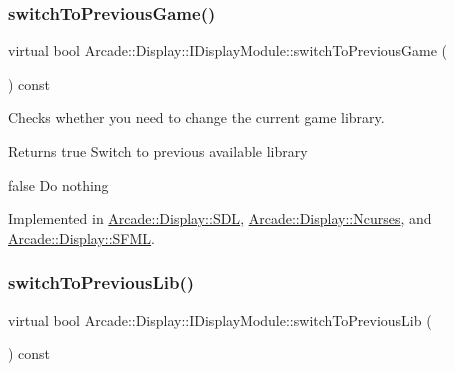 \mbox{\label{classArcade_1_1Display_1_1IDisplayModule_a3bbbfe00907c8f3e4c7ef1aadedcc513}} 
\subsubsection{\texorpdfstring{switchToPreviousGame()}{switchToPreviousGame()}}
{\footnotesize\ttfamily virtual bool Arcade\+::\+Display\+::\+I\+Display\+Module\+::switch\+To\+Previous\+Game (\begin{DoxyParamCaption}{ }\end{DoxyParamCaption}) const\hspace{0.3cm}{\ttfamily [pure virtual]}}



Checks whether you need to change the current game library. 

\begin{DoxyReturn}{Returns}
true Switch to previous available library 

false Do nothing 
\end{DoxyReturn}


Implemented in \mbox{\hyperlink{classArcade_1_1Display_1_1SDL_ad9bf495fb4e7499c81b2d65a0602e7f1}{Arcade\+::\+Display\+::\+S\+DL}}, \mbox{\hyperlink{classArcade_1_1Display_1_1Ncurses_ad2e7818db1e8f3328083ed6cab2f7517}{Arcade\+::\+Display\+::\+Ncurses}}, and \mbox{\hyperlink{classArcade_1_1Display_1_1SFML_ae5dbff9dd547fb0a09e478e11bf74c11}{Arcade\+::\+Display\+::\+S\+F\+ML}}.

\mbox{\label{classArcade_1_1Display_1_1IDisplayModule_a498d51597164e9f92e97ec2afee426b0}} 
\subsubsection{\texorpdfstring{switchToPreviousLib()}{switchToPreviousLib()}}
{\footnotesize\ttfamily virtual bool Arcade\+::\+Display\+::\+I\+Display\+Module\+::switch\+To\+Previous\+Lib (\begin{DoxyParamCaption}{ }\end{DoxyParamCaption}) const\hspace{0.3cm}{\ttfamily [pure virtual]}}



